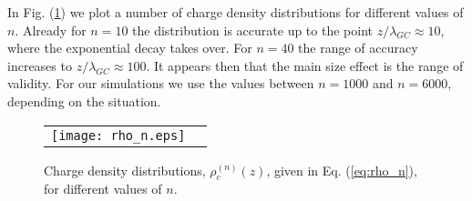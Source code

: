 \documentclass[pre,twocolumn,graphicx]{revtex4-1}
\begin{document}
In Fig. (\ref{fig:rho_n}) we plot a number of charge density distributions for different values of $n$.  Already for 
$n=10$ the distribution is accurate up to the point $z/\lambda_{GC}\approx 10$, where the exponential
decay takes over.  For $n=40$ the range of accuracy increases to $z/\lambda_{GC} \approx 100$.  
It appears then that the main size effect is the range of validity.  
For our simulations we use the values between $n=1000$ and 
$n=6000$, depending on the situation.  
\graphicspath{{figures/}}
\begin{figure}[h] 
 \begin{center}
 \begin{tabular}{rr}
  \texttt{[image: rho\_n.eps]}
 \end{tabular}
 \end{center}
\caption{Charge density distributions, $\rho_c^{(n)}(z)$, given in Eq. (\ref{eq:rho_n}), for different 
values of $n$.  } 
\label{fig:rho_n}
\end{figure}







\end{document}
